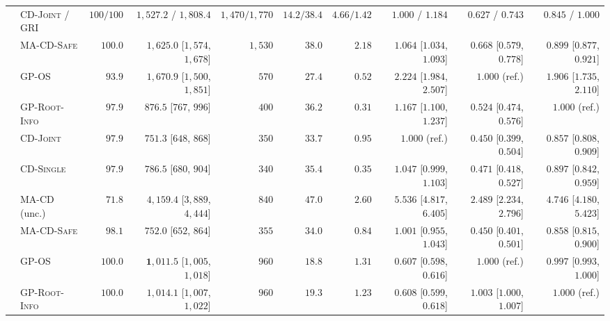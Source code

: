 \documentclass{article}
\theoremstyle{plain}
\theoremstyle{definition}
\begin{document}
\begin{table}[!htbp]
{\begin{tabular}{@{}llrrrrrrrr@{}}
\midrule
{}
  & \textsc{CD-Joint} / \textsc{GRI} & $100/100$ & $1{,}527.2$ / $1{,}808.4$ & $1{,}470/1{,}770$ & $14.2/38.4$ & $4.66/1.42$ & $1.000$ / $1.184$ & $0.627$ / $0.743$ & $0.845$ / $1.000$ \\
  & \textsc{MA-CD-Safe}        & $100.0$ & $1{,}625.0$ [$1{,}574$, $1{,}678$]   & $1{,}530$  & $38.0$ & $2.18$ & $1.064$ [$1.034$, $1.093$] & $0.668$ [$0.579$, $0.778$] & $\mathbf{0.899}$ [$0.877$, $0.921$] \\
\midrule
{}
  & \textsc{GP-OS}             & $93.9$  & $1{,}670.9$ [$1{,}500$, $1{,}851$]   & $570$      & $27.4$ & $0.52$ & $2.224$ [$1.984$, $2.507$] & $1.000$ (ref.)             & $1.906$ [$1.735$, $2.110$] \\
  & \textsc{GP-Root-Info}      & $97.9$  & $876.5$ [$767$, $996$]               & $400$      & $36.2$ & $0.31$ & $1.167$ [$1.100$, $1.237$] & $0.524$ [$0.474$, $0.576$] & $1.000$ (ref.) \\
  & \textsc{CD-Joint}          & $97.9$  & $\mathbf{751.3}$ [$648$, $868$]      & $350$      & $33.7$ & $0.95$ & $1.000$ (ref.)             & $0.450$ [$0.399$, $0.504$] & $0.857$ [$0.808$, $0.909$] \\
  & \textsc{CD-Single}         & $97.9$  & $786.5$ [$680$, $904$]               & $340$      & $35.4$ & $0.35$ & $1.047$ [$0.999$, $1.103$] & $0.471$ [$0.418$, $0.527$] & $0.897$ [$0.842$, $0.959$] \\
  & \textsc{MA-CD} (unc.)      & $71.8$  & $4{,}159.4$ [$3{,}889$, $4{,}444$]   & $840$      & $47.0$ & $2.60$ & $5.536$ [$4.817$, $6.405$] & $2.489$ [$2.234$, $2.796$] & $4.746$ [$4.180$, $5.423$] \\
  & \textsc{MA-CD-Safe}        & $\mathbf{98.1}$ & $\mathbf{752.0}$ [$652$, $864$] & $355$      & $34.0$ & $0.84$ & $\mathbf{1.001}$ [$0.955$, $1.043$] & $\mathbf{0.450}$ [$0.401$, $0.501$] & $\mathbf{0.858}$ [$0.815$, $0.900$] \\
\midrule
{}
  & \textsc{GP-OS}             & $100.0$ & $\mathbf{1{,}011.5}$ [$1{,}005$, $1{,}018$] & $960$      & $18.8$ & $1.31$ & $0.607$ [$0.598$, $0.616$] & $1.000$ (ref.)             & $0.997$ [$0.993$, $1.000$] \\
  & \textsc{GP-Root-Info}      & $100.0$ & $1{,}014.1$ [$1{,}007$, $1{,}022$]   & $960$      & $19.3$ & $1.23$ & $0.608$ [$0.599$, $0.618$] & $1.003$ [$1.000$, $1.007$] & $1.000$ (ref.) \\

\end{tabular}}
\end{table}
\end{document}
